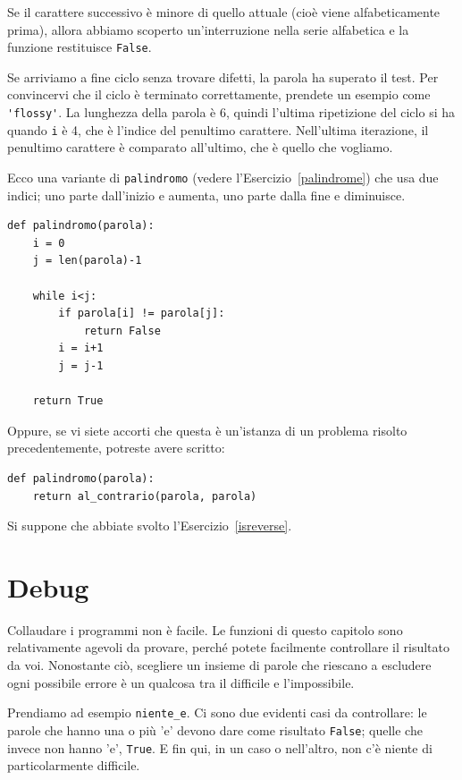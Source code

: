 \documentclass[10pt]{book}
\begin{document}
Se il carattere successivo è minore di quello attuale (cioè viene alfabeticamente prima), allora abbiamo scoperto un'interruzione nella serie alfabetica e la funzione restituisce {\tt False}.

Se arriviamo a fine ciclo senza trovare difetti, la parola ha superato il test. Per convincervi che il ciclo è terminato correttamente, prendete un esempio come \verb"'flossy'".  La lunghezza della parola è 6, quindi l'ultima ripetizione del ciclo si ha quando {\tt i} è 4, che è l'indice del penultimo carattere. Nell'ultima iterazione, il penultimo carattere è comparato all'ultimo, che è quello che vogliamo.

Ecco una variante di \verb"palindromo" (vedere l'Esercizio~\ref{palindrome}) che usa due indici; uno parte dall'inizio e aumenta, uno parte dalla fine e diminuisce.

\begin{verbatim}
def palindromo(parola):
    i = 0
    j = len(parola)-1

    while i<j:
        if parola[i] != parola[j]:
            return False
        i = i+1
        j = j-1

    return True
\end{verbatim}

Oppure, se vi siete accorti che questa è un'istanza di un problema risolto precedentemente, potreste avere scritto:

\begin{verbatim}
def palindromo(parola):
    return al_contrario(parola, parola)
\end{verbatim}

Si suppone che abbiate svolto l'Esercizio~\ref{isreverse}.


\section{Debug}

Collaudare i programmi non è facile. Le funzioni di questo capitolo sono relativamente agevoli da provare, perché potete facilmente controllare il risultato da voi. Nonostante ciò, scegliere un insieme di parole che riescano a escludere ogni possibile errore è un qualcosa tra il difficile e l'impossibile.

Prendiamo ad esempio \verb"niente_e". Ci sono due evidenti casi da controllare: le parole che hanno una o più 'e' devono dare come risultato {\tt False};
quelle che invece non hanno 'e', {\tt True}. E fin qui, in un caso o nell'altro, non c'è niente di particolarmente difficile.
\end{document}
